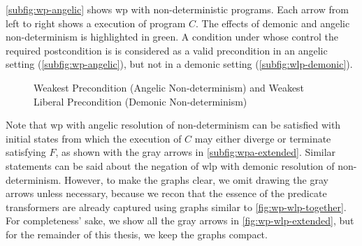 \autoref{subfig:wp-angelic} shows wp with non-deterministic programs. 
Each arrow from left to right shows a  execution of program $C$. 
The effects of demonic and angelic non-determinism is highlighted in green. 
A condition under whose control the required postcondition is  is considered as a valid precondition in an angelic setting (\autoref{subfig:wp-angelic}), but not in a demonic setting (\autoref{subfig:wlp-demonic}). 


\begin{figure}[ht]\centering
  \hfill
\caption{Weakest Precondition (Angelic Non-determinism) and Weakest Liberal Precondition (Demonic Non-determinism)}
\label{fig:wp-wlp-together}
\end{figure}

Note that wp with angelic resolution of non-determinism can be satisfied with initial states from which the execution of $C$ may either diverge or terminate satisfying $F$, as shown with the gray arrows in \autoref{subfig:wpa-extended}. 
Similar statements can be said about the negation of wlp with demonic resolution of non-determinism. 
However, to make the graphs clear, we omit drawing the gray arrows unless necessary, because we recon that the essence of the predicate transformers are already captured using graphs similar to \autoref{fig:wp-wlp-together}. 
For completeness' sake, we show all the gray arrows in \autoref{fig:wp-wlp-extended}, but for the remainder of this thesis, we keep the graphs compact. 

